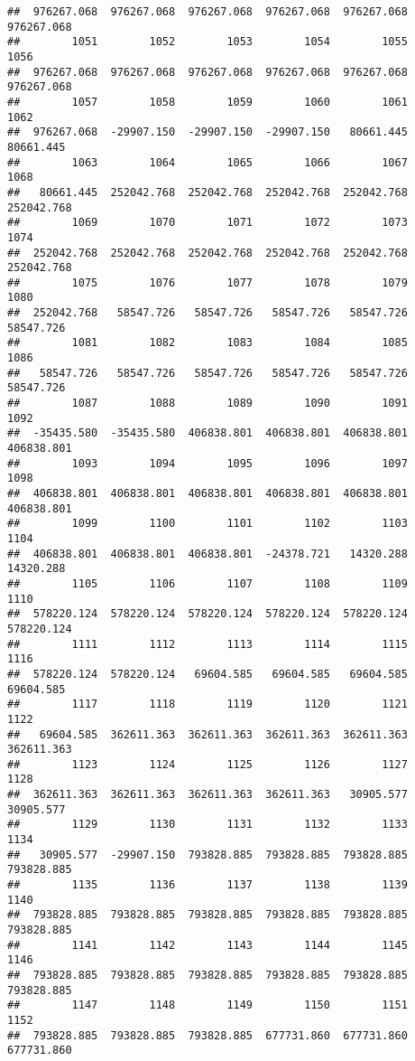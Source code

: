 \documentclass[
]{book}
\begin{document}
\begin{verbatim}
##  976267.068  976267.068  976267.068  976267.068  976267.068  976267.068 
##        1051        1052        1053        1054        1055        1056 
##  976267.068  976267.068  976267.068  976267.068  976267.068  976267.068 
##        1057        1058        1059        1060        1061        1062 
##  976267.068  -29907.150  -29907.150  -29907.150   80661.445   80661.445 
##        1063        1064        1065        1066        1067        1068 
##   80661.445  252042.768  252042.768  252042.768  252042.768  252042.768 
##        1069        1070        1071        1072        1073        1074 
##  252042.768  252042.768  252042.768  252042.768  252042.768  252042.768 
##        1075        1076        1077        1078        1079        1080 
##  252042.768   58547.726   58547.726   58547.726   58547.726   58547.726 
##        1081        1082        1083        1084        1085        1086 
##   58547.726   58547.726   58547.726   58547.726   58547.726   58547.726 
##        1087        1088        1089        1090        1091        1092 
##  -35435.580  -35435.580  406838.801  406838.801  406838.801  406838.801 
##        1093        1094        1095        1096        1097        1098 
##  406838.801  406838.801  406838.801  406838.801  406838.801  406838.801 
##        1099        1100        1101        1102        1103        1104 
##  406838.801  406838.801  406838.801  -24378.721   14320.288   14320.288 
##        1105        1106        1107        1108        1109        1110 
##  578220.124  578220.124  578220.124  578220.124  578220.124  578220.124 
##        1111        1112        1113        1114        1115        1116 
##  578220.124  578220.124   69604.585   69604.585   69604.585   69604.585 
##        1117        1118        1119        1120        1121        1122 
##   69604.585  362611.363  362611.363  362611.363  362611.363  362611.363 
##        1123        1124        1125        1126        1127        1128 
##  362611.363  362611.363  362611.363  362611.363   30905.577   30905.577 
##        1129        1130        1131        1132        1133        1134 
##   30905.577  -29907.150  793828.885  793828.885  793828.885  793828.885 
##        1135        1136        1137        1138        1139        1140 
##  793828.885  793828.885  793828.885  793828.885  793828.885  793828.885 
##        1141        1142        1143        1144        1145        1146 
##  793828.885  793828.885  793828.885  793828.885  793828.885  793828.885 
##        1147        1148        1149        1150        1151        1152 
##  793828.885  793828.885  793828.885  677731.860  677731.860  677731.860 

\end{verbatim}
\end{document}

